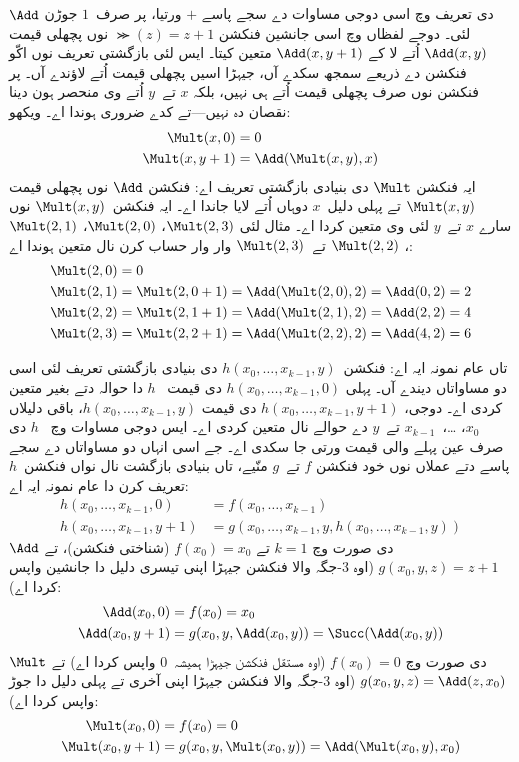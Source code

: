 \documentclass[../../../include/open-logic-section]{subfiles}
\begin{document}
$\Add$ دی تعریف وچ اسی دوجی مساوات دے سجے
پاسے $+$ ورتیا، پر صرف~$1$ جوڑن لئی۔ دوجے لفظاں
وچ اسی جانشین فنکشن $\Succ(z) = z+1$ نوں پچھلی
قیمت $\Add(x,y)$ اُتے لا کے $\Add(x,y+1)$
متعین کیتا۔ ایس لئی بازگشتی تعریف نوں اکّو فنکشن
دے ذریعے سمجھ سکدے آں، جیہڑا اسیں پچھلی قیمت اُتے
لاؤندے آں۔ پر فنکشن نوں صرف پچھلی قیمت اُتے ہی
نہیں، بلکہ $x$ تے~$y$ اُتے وی منحصر ہون دینا
نقصان دہ نہیں---تے کدے ضروری ہوندا اے۔ ویکھو:
\begin{align*}
  \Mult(x,0) & =  0 \\
  \Mult(x,y+1) & =  \Add(\Mult(x,y),x)
\end{align*}
ایہ فنکشن $\Mult$ دی بنیادی بازگشتی تعریف اے:
فنکشن $\Add$ نوں پچھلی قیمت $\Mult(x,y)$
تے پہلی دلیل~$x$ دوہاں اُتے لایا جاندا اے۔
ایہ فنکشن~$\Mult(x,y)$ نوں سارے $x$ تے~$y$
لئی وی متعین کردا اے۔ مثال لئی $\Mult(2,3)$،
$\Mult(2,0)$، $\Mult(2,1)$،
$\Mult(2,2)$ تے~$\Mult(2,3)$ وار وار حساب
کرن نال متعین ہوندا اے:
\begin{align*}
  \Mult(2,0) & = 0\\
  \Mult(2,1) & = \Mult(2,0+1) =
  \Add(\Mult(2,0), 2) = \Add(0, 2) = 2\\
  \Mult(2,2) & = \Mult(2,1+1) =
  \Add(\Mult(2,1), 2) = \Add(2, 2) = 4\\
  \Mult(2,3) & = \Mult(2,2+1) =
  \Add(\Mult(2,2), 2) = \Add(4, 2) = 6
\end{align*}

تاں عام نمونہ ایہ اے: فنکشن~$h(x_0, \dots, x_{k-1}, y)$
دی بنیادی بازگشتی تعریف لئی اسی دو مساواتاں دیندے
آں۔ پہلی $h(x_0, \dots, x_{k-1}, 0)$ دی قیمت
~$h$ دا حوالہ دتے بغیر متعین کردی اے۔ دوجی،
$h(x_0, \dots, x_{k-1}, y+1)$
دی قیمت $h(x_0, \dots, x_{k-1}, y)$،
باقی دلیلاں $x_0$، \dots،~$x_{k-1}$ تے~$y$
دے حوالے نال متعین کردی اے۔ ایس دوجی مساوات وچ
~$h$ دی صرف عین پہلے والی قیمت ورتی جا سکدی اے۔
جے اسی انہاں دو مساواتاں دے سجے پاسے دتے عملاں
نوں خود فنکشن $f$ تے~$g$ منّیے، تاں بنیادی بازگشت
نال نواں فنکشن~$h$ تعریف کرن دا عام نمونہ ایہ اے:
\begin{align*}
  h(x_0, \dots, x_{k-1}, 0) & = f(x_0, \dots, x_{k-1})\\
  h(x_0, \dots, x_{k-1}, y+1) & =
  g(x_0, \dots, x_{k-1}, y, h(x_0, \dots, x_{k-1}, y))
\end{align*}
$\Add$ دی صورت وچ $k=1$ تے $f(x_0) = x_0$
(شناختی فنکشن)، تے $g(x_0, y, z) = z + 1$
(اوہ $3$-جگہ والا فنکشن جیہڑا اپنی تیسری دلیل
دا جانشین واپس کردا اے):
\begin{align*}
  \Add(x_0, 0) & = f(x_0) = x_0\\
  \Add(x_0, y+1) & = g(x_0, y, \Add(x_0, y)) =
  \Succ(\Add(x_0, y))
\end{align*}
$\Mult$ دی صورت وچ $f(x_0) = 0$ (اوہ مستقل
فنکشن جیہڑا ہمیشہ~$0$ واپس کردا اے) تے
$g(x_0, y, z) = \Add(z,x_0)$ (اوہ
$3$-جگہ والا فنکشن جیہڑا اپنی آخری تے پہلی
دلیل دا جوڑ واپس کردا اے):
\begin{align*}
  \Mult(x_0,0) & =  f(x_0) = 0 \\
  \Mult(x_0,y+1) & =  g(x_0, y, \Mult(x_0,y)) =
  \Add(\Mult(x_0,y), x_0)
\end{align*}
\end{document}
